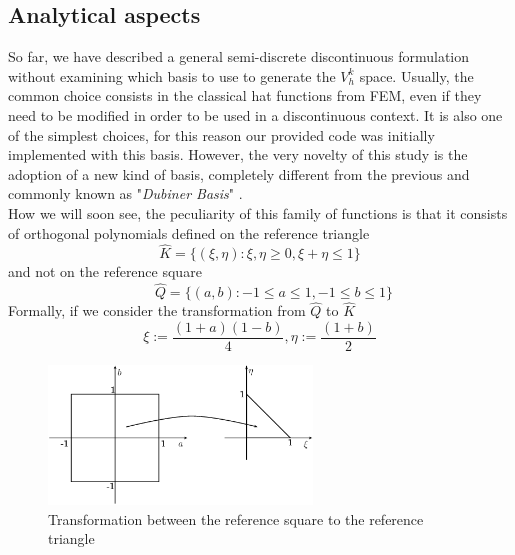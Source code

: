 \documentclass[a4paper,11pt]{article}
\begin{document}
    \subsection{Analytical aspects}\label{analytical_aspects}
    So far, we have described a general semi-discrete discontinuous formulation without examining which basis to use to generate the $V_h^k$ space. Usually, the common choice consists in the classical hat functions from FEM, even if they need to be modified in order to be used in a discontinuous context. It is also one of the simplest choices, for this reason our provided code was initially implemented with this basis. However, the very novelty of this study is the adoption of a new kind of basis, completely different from the previous and commonly known as "\emph{Dubiner Basis}" \cite{dubiner}. \\
    How we will soon see, the peculiarity of this family of functions is that it consists of orthogonal polynomials defined on the reference triangle
    \begin{equation}
    \hat{K}=\{ (\xi, \eta) : \xi, \eta \ge 0,	\xi+\eta \le 1 \}
    \end{equation}
    and not on the reference square
    \begin{equation}
    \quad \quad \hat{Q}=\{ (a, b) : -1 \le a \le 1, -1 \le b \le 1 \}
    \end{equation}
    Formally, if we consider the transformation from $\hat{Q}$ to $\hat{K}$
    \begin{equation}\label{transformation_formula}
    \xi:=\frac{(1+a)(1-b)}{4},  \eta:=\frac{(1+b)}{2}
    \end{equation}
    
    \begin{figure}[h]
    \begin{center}
    \includegraphics[width = 7cm]{./transformation.png}
    	\caption{Transformation between the reference square to the reference triangle}
    	\label{transformation}
    \end{center}
    \end{figure}
    
\end{document}
